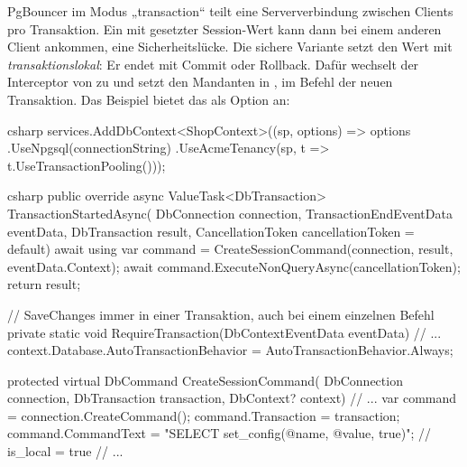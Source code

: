 PgBouncer im Modus „transaction“ teilt eine Serververbindung zwischen Clients pro
Transaktion. Ein mit
 gesetzter Session-Wert kann dann bei einem anderen Client ankommen, eine
Sicherheitslücke. Die sichere Variante setzt den Wert mit
 \emph{transaktionslokal}: Er endet mit Commit oder Rollback. Dafür wechselt der
Interceptor von  zu
 und setzt den Mandanten in
, im Befehl der neuen Transaktion. Das Beispiel bietet das
als Option an:

\begin{sourcecode}[Anwendung]{csharp}
services.AddDbContext<ShopContext>((sp, options) => options
    .UseNpgsql(connectionString)
    .UseAcmeTenancy(sp, t => t.UseTransactionPooling()));
\end{sourcecode}

\begin{sourcecode}{csharp}
public override async ValueTask<DbTransaction> TransactionStartedAsync(
    DbConnection connection,
    TransactionEndEventData eventData,
    DbTransaction result,
    CancellationToken cancellationToken = default)
{
    await using var command = CreateSessionCommand(connection, result, eventData.Context);
    await command.ExecuteNonQueryAsync(cancellationToken);
    return result;
}

// SaveChanges immer in einer Transaktion, auch bei einem einzelnen Befehl
private static void RequireTransaction(DbContextEventData eventData)
{
    // ...
        context.Database.AutoTransactionBehavior = AutoTransactionBehavior.Always;
}

protected virtual DbCommand CreateSessionCommand(
    DbConnection connection, DbTransaction transaction, DbContext? context)
{
    // ...
    var command = connection.CreateCommand();
    command.Transaction = transaction;
    command.CommandText = "SELECT set_config(@name, @value, true)";   // is_local = true
    // ...
}
\end{sourcecode}

